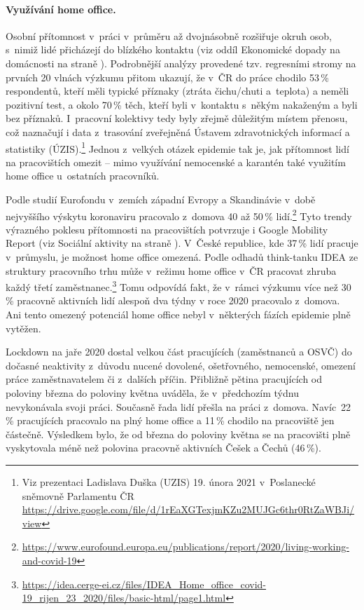 \paragraph{Využívání home office.} Osobní přítomnost v práci v průměru až dvojnásobně rozšiřuje okruh osob, s nimiž lidé přicházejí do blízkého kontaktu (viz oddíl Ekonomické dopady na domácnosti na straně \pageref{Ekonomicke_dopady}). Podrobnější analýzy provedené tzv. regresními stromy na prvních 20 vlnách výzkumu  přitom ukazují, že v ČR do práce chodilo 53\,\% respondentů, kteří měli typické příznaky (ztráta čichu/chuti a teplota) a neměli pozitivní test, a okolo 70\,\% těch, kteří byli v kontaktu s někým nakaženým a byli bez příznaků. I~pracovní kolektivy tedy byly zřejmě důležitým místem přenosu, což naznačují i data z trasování zveřejněná Ústavem zdravotnických informací a statistiky (ÚZIS).\footnote{Viz prezentaci Ladislava Duška (UZIS) 19. února 2021 v~Poslanecké sněmovně Parlamentu ČR \url{https://drive.google.com/file/d/1rEaXGTexjmKZu2MUJGc6thr0RtZaWBJi/view}} Jednou z velkých otázek epidemie tak je, jak přítomnost lidí na pracovištích omezit – mimo využívání nemocenské a karantén také využitím home office u~ostatních pracovníků.

Podle studií Eurofondu v zemích západní Evropy a Skandinávie v době nejvyššího výskytu koronaviru pracovalo z domova 40 až 50\,\% lidí.\footnote{ \url{https://www.eurofound.europa.eu/publications/report/2020/living-working-and-covid-19}} Tyto trendy výrazného poklesu přítomnosti na pracovištích potvrzuje i Google Mobility Report (viz Sociální aktivity na straně \pageref{Socialni_aktivity}). V České republice, kde 37\,\% lidí pracuje v průmyslu, je možnost home office omezená. Podle odhadů think-tanku IDEA ze struktury pracovního trhu může v~režimu home office v ČR pracovat zhruba každý třetí za\-měst\-na\-nec.\footnote{\url{https://idea.cerge-ei.cz/files/IDEA\_Home\_office\_covid-19\_rijen\_23\_2020/files/basic-html/page1.html}} Tomu odpovídá fakt, že v rámci výzkumu  více než 30\,\% pracovně aktivních lidí alespoň dva týdny v roce 2020 pracovalo z domova. Ani tento omezený potenciál home office nebyl v některých fázích epidemie plně vytěžen.

Lockdown na jaře 2020 dostal velkou část pracujících (zaměstnanců a OSVČ) do dočasné neaktivity z důvodu nucené dovolené, ošetřovného, nemocenské, omezení práce zaměstnavatelem či z~dalších příčin. Přibližně pětina pracujících od poloviny března do poloviny května uváděla, že v~předchozím týdnu nevykonávala svoji práci. Současně řada lidí přešla na práci z domova. Navíc 22\,\% pracujících pracovalo na plný home office a 11\,\% chodilo na pracoviště jen částečně. Výsledkem bylo, že od března do poloviny května se na pracovišti plně vyskytovala méně než polovina pracovně aktivních Češek a Čechů (46\,\%).

